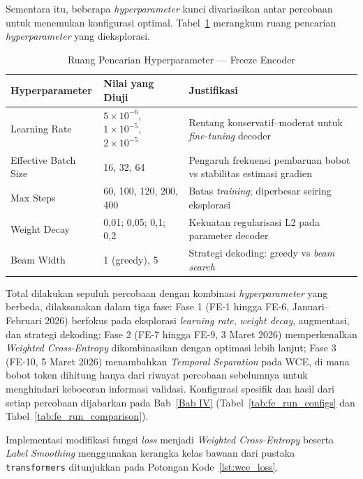 Sementara itu, beberapa \textit{hyperparameter} kunci divariasikan antar percobaan untuk menemukan konfigurasi optimal. Tabel~\ref{tab:fe_search_space} merangkum ruang pencarian \textit{hyperparameter} yang dieksplorasi.

\begin{table}[H]
\centering
\renewcommand{\arraystretch}{1.5}
\caption{Ruang Pencarian Hyperparameter --- Freeze Encoder}
\label{tab:fe_search_space}
\begin{tabularx}{\textwidth}{|l|l|X|}
\hline
\textbf{Hyperparameter} & \textbf{Nilai yang Diuji} & \textbf{Justifikasi} \\
\hline
Learning Rate & $5 \times 10^{-6}$, $1 \times 10^{-5}$, $2 \times 10^{-5}$ & Rentang konservatif--moderat untuk \textit{fine-tuning} decoder \\
\hline
Effective Batch Size & 16, 32, 64 & Pengaruh frekuensi pembaruan bobot vs stabilitas estimasi gradien \\
\hline
Max Steps & 60, 100, 120, 200, 400 & Batas \textit{training}; diperbesar seiring eksplorasi \\
\hline
Weight Decay & 0,01; 0,05; 0,1; 0,2 & Kekuatan regularisasi L2 pada parameter decoder \\
\hline
Beam Width & 1 (greedy), 5 & Strategi dekoding: greedy vs \textit{beam search} \\
\hline
\end{tabularx}
\end{table}

Total dilakukan sepuluh percobaan dengan kombinasi \textit{hyperparameter} yang berbeda, dilaksanakan dalam tiga fase: Fase 1 (FE-1 hingga FE-6, Januari--Februari 2026) berfokus pada eksplorasi \textit{learning rate}, \textit{weight decay}, augmentasi, dan strategi dekoding; Fase 2 (FE-7 hingga FE-9, 3 Maret 2026) memperkenalkan \textit{Weighted Cross-Entropy} dikombinasikan dengan optimasi lebih lanjut; Fase 3 (FE-10, 5 Maret 2026) menambahkan \textit{Temporal Separation} pada WCE, di mana bobot token dihitung hanya dari riwayat percobaan sebelumnya untuk menghindari kebocoran informasi validasi. Konfigurasi spesifik dan hasil dari setiap percobaan dijabarkan pada Bab~\ref{Bab IV} (Tabel~\ref{tab:fe_run_configs} dan Tabel~\ref{tab:fe_run_comparison}).

Implementasi modifikasi fungsi \textit{loss} menjadi \textit{Weighted Cross-Entropy} beserta \textit{Label Smoothing} menggunakan kerangka kelas bawaan dari pustaka \texttt{transformers} ditunjukkan pada Potongan Kode~\ref{lst:wce_loss}.

